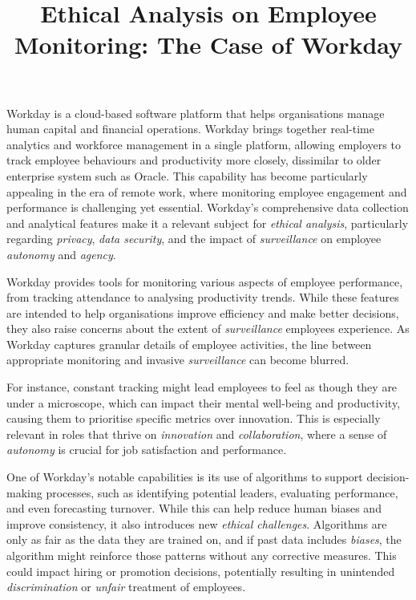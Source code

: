 \documentclass[a4paper]{article}
\title{\textbf{Ethical Analysis on Employee Monitoring: The Case of Workday}}
\author{} %
\date{} %
\begin{document}
\maketitle

Workday is a cloud-based software platform that helps organisations manage human capital and financial operations. Workday brings together real-time analytics and workforce management in a single platform, allowing employers to track employee behaviours and productivity more closely, dissimilar to older enterprise system such as Oracle. This capability has become particularly appealing in the era of remote work, where monitoring employee engagement and performance is challenging yet essential. Workday’s comprehensive data collection and analytical features make it a relevant subject for \textit{ethical analysis}, particularly regarding \textit{privacy}, \textit{data security}, and the impact of \textit{surveillance} on employee \textit{autonomy} and \textit{agency}.

Workday provides tools for monitoring various aspects of employee performance, from tracking attendance to analysing productivity trends. While these features are intended to help organisations improve efficiency and make better decisions, they also raise concerns about the extent of \textit{surveillance} employees experience. As Workday captures granular details of employee activities, the line between appropriate monitoring and invasive \textit{surveillance} can become blurred.

For instance, constant tracking might lead employees to feel as though they are under a microscope, which can impact their mental well-being and productivity, causing them to prioritise specific metrics over innovation. This is especially relevant in roles that thrive on \textit{innovation} and \textit{collaboration}, where a sense of \textit{autonomy} is crucial for job satisfaction and performance.

One of Workday’s notable capabilities is its use of algorithms to support decision-making processes, such as identifying potential leaders, evaluating performance, and even forecasting turnover. While this can help reduce human biases and improve consistency, it also introduces new \textit{ethical challenges}. Algorithms are only as fair as the data they are trained on, and if past data includes \textit{biases}, the algorithm might reinforce those patterns without any corrective measures. This could impact hiring or promotion decisions, potentially resulting in unintended \textit{discrimination} or \textit{unfair} treatment of employees.
\end{document}
